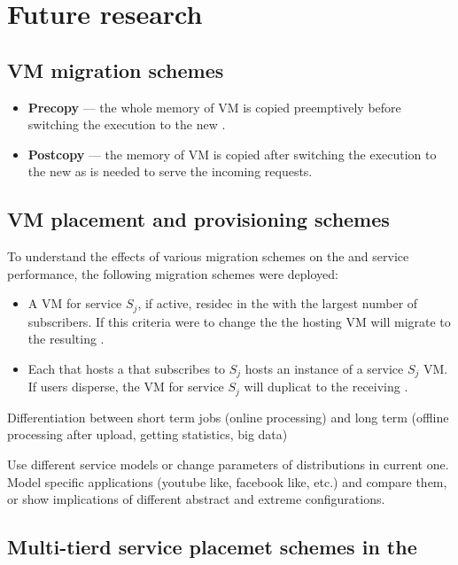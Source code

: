 \section{Future research}
\label{sec:future_research}

\subsection{VM migration schemes}
\begin{itemize}
\item \textbf{Precopy} --- the whole memory of VM is copied preemptively before switching the execution to the new \dc{}.
\item \textbf{Postcopy} --- the memory of VM is copied after switching the execution to the new \dc{} as is needed to serve the incoming requests.
\end{itemize}

\subsection{VM placement and \dc{} provisioning schemes}
To understand the effects of various migration schemes on the \dc and service performance, the following migration schemes were deployed:

\begin{itemize}
\item A VM for service $S_j$, if active, residec in the \dc with the largest number of subscribers. If this criteria were to change the the hosting VM will migrate to the resulting \dc.
\item Each \dc that hosts a \ue that subscribes to $S_j$ hosts an instance of a service $S_j$ VM. If users disperse, the VM for service $S_j$ will duplicat to the receiving \dc.
\end{itemize}

Differentiation between short term jobs (online processing) and long term (offline processing after upload, getting statistics, big data)

Use different service models or change parameters of distributions in current one.
Model specific applications (youtube like, facebook like, etc.) and compare them, or show implications of different abstract and extreme configurations.

\subsection{Multi-tierd service placemet schemes in the \xcloud{}}
